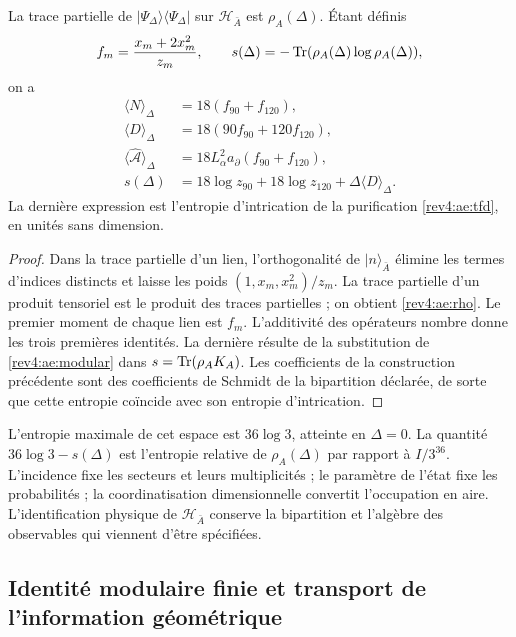 \begin{proposition}
\label{rev4:ae:entropia}
La trace partielle de \(|\Psi_\Delta\rangle\langle\Psi_\Delta|\)
sur \(\mathscr H_{\bar A}\) est \(\rho_A(\Delta)\). Étant définis
\[
 f_m=\frac{x_m+2x_m^2}{z_m},
 \qquad s(\Delta)=-\operatorname{Tr}(\rho_A(\Delta)\log\rho_A(\Delta)),
\]
on a
\begin{align}
 \langle N\rangle_\Delta&=18(f_{90}+f_{120}),\\
 \langle D\rangle_\Delta&=18(90f_{90}+120f_{120}),\\
 \langle\widehat{\mathcal A}\rangle_\Delta
 &=18L_\alpha^2a_\partial(f_{90}+f_{120}),\\
 s(\Delta)&=18\log z_{90}+18\log z_{120}
             +\Delta\langle D\rangle_\Delta.
 \label{rev4:ae:entropia-formula}
\end{align}
La dernière expression est l'entropie d'intrication de la purification \eqref{rev4:ae:tfd}, en unités sans dimension.
\end{proposition}
\begin{proof}
Dans la trace partielle d’un lien, l’orthogonalité de
\(|n\rangle_{\bar A}\) élimine les termes d’indices distincts et
laisse les poids \((1,x_m,x_m^2)/z_m\). La trace partielle d’un produit
tensoriel est le produit des traces partielles ; on obtient
\eqref{rev4:ae:rho}. Le premier moment de chaque lien est \(f_m\).
L’additivité des opérateurs nombre donne les trois premières identités.
La dernière résulte de la substitution de \eqref{rev4:ae:modular} dans
\(s=\operatorname{Tr}(\rho_AK_A)\). Les coefficients de la construction précédente
sont des coefficients de Schmidt de la bipartition déclarée, de sorte que
cette entropie coïncide avec son entropie d’intrication.
\end{proof}

L'entropie maximale de cet espace est \(36\log3\), atteinte en \(\Delta=0\). La quantité \(36\log3-s(\Delta)\) est l'entropie relative de \(\rho_A(\Delta)\) par rapport à \(I/3^{36}\). L'incidence fixe les secteurs et leurs multiplicités ; le paramètre de l'état fixe les probabilités ; la coordinatisation dimensionnelle convertit l'occupation en aire. L'identification physique de \(\mathscr H_{\bar A}\) conserve la bipartition et l'algèbre des observables qui viennent d'être spécifiées.

\subsection{Identité modulaire finie et transport de l'information géométrique}

